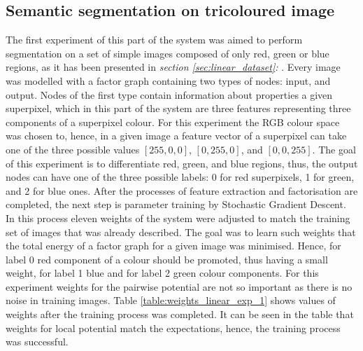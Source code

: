 \subsection{Semantic segmentation on tricoloured image}
The first experiment of this part of the system was aimed to perform segmentation on a set of simple images composed of only red, green or blue regions, as it has been presented in \textit{section \ref{sec:linear_dataset}: }. Every image was modelled with a factor graph containing two types of nodes: input, and output. Nodes of the first type contain information about properties a given superpixel, which in this part of the system are three features representing three components of a superpixel colour. For this experiment the RGB colour space was chosen to, hence, in a given image a feature vector of a superpixel can take one of the three possible values $[255,0,0]$, $[0,255,0]$, and $[0,0,255]$. The goal of this experiment is to differentiate red, green, and blue regions, thus, the output nodes can have one of the three possible labels: 0 for red superpixels, 1 for green, and 2 for blue ones. After the processes of feature extraction and factorisation are completed, the next step is parameter training by Stochastic Gradient Descent. In this process eleven weights of the system were adjusted to match the training set of images that was already described. The goal was to learn such weights that the total energy of a factor graph for a given image was minimised. Hence, for label 0 red component of a colour should be promoted, thus having a small weight, for label 1 blue and for label 2 green colour components. For this experiment weights for the pairwise potential are not so important as there is no noise in training images. Table \ref{table:weights_linear_exp_1} shows values of weights after the training process was completed. It can be seen in the table that weights for local potential match the expectations, hence, the training process was successful.
